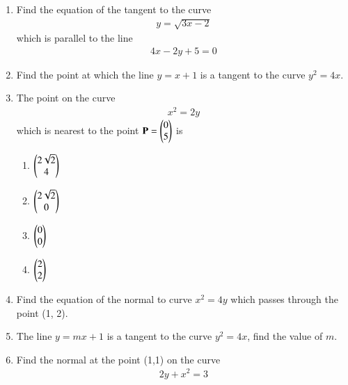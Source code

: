 \begin{enumerate}[label=\thesubsection.\arabic*,ref=\thesubsection.\theenumi]
\label{chapters/12/6/3/19}
\\
\solution

\item 
Find the equation of the tangent to the curve 
\begin{align}
	y = \sqrt{3x-2}
\end{align}
which is parallel to the line
\begin{align}
	4x-2y+5 = 0
\end{align}
\solution 
\label{chapters/12/6/3/25}

\item 
Find the point at which the line $y = x + 1$ is a tangent to the curve $y^2 = 4x$.
\\
\solution 
\label{chapters/12/6/3/27}

    \item The point on the curve 
\label{chapters/12/6/5/27}
    \begin{align}
        x^2 = 2y
        \label{eq:chapters/12/6/5/27/curve}
    \end{align}
    which is nearest to the point 
    $\mathbf{P} = \begin{pmatrix}0\\5\end{pmatrix}$ is
    \begin{enumerate}
        \item $\begin{pmatrix}2\sqrt{2}\\4\end{pmatrix}$
        \item $\begin{pmatrix}2\sqrt{2}\\0\end{pmatrix}$
        \item $\begin{pmatrix}0\\0\end{pmatrix}$
        \item $\begin{pmatrix}2\\2\end{pmatrix}$
    \end{enumerate}
    \solution 

\item 
Find the equation of the normal to curve $x^2 = 4y$ which passes through the point
(1, 2).
\\
\solution 
\label{chapters/12/6/6/4}

\item 
 The line $y=mx+1$ is a tangent to the curve $y^2 = 4x$, find the value of $m$. 
 \\
 \solution 
\label{chapters/12/6/6/21}

\item 
\label{chapters/12/6/6/22}
Find the normal at the point (1,1) on the curve 
\begin{align}
2y+x^2=3
\end{align}
\solution

\end{enumerate}
